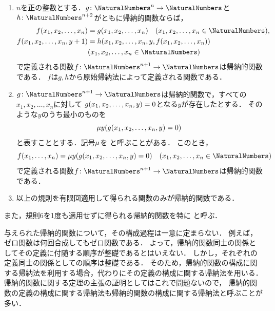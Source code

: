 \begin{Def}
\begin{enumerate}
		      \(f\)は\(g, h\)から関数合成によって得られる関数である．
		\item \(n\)を正の整数とする．\(g \colon \NaturalNumbers^n \to \NaturalNumbers\)と\(h \colon \NaturalNumbers^{n+2}\)がともに帰納的関数ならば，
		      \begin{align*}
			      \apply{f}{x_1, x_2, \dots, x_n}        & = \apply{g}{x_1, x_2, \dots, x_n} \quad \text{(\(x_1, x_2, \dots, x_n \in \NaturalNumbers\))}, \\
			      \apply{f}{x_1, x_2, \dots, x_n, y + 1} & = \apply{h}{x_1, x_2, \dots, x_n, y, \apply{f}{x_1, x_2, \dots, x_n}}                          \\
			                                             & \text{(\(x_1, x_2, \dots, x_n \in \NaturalNumbers\))}
		      \end{align*}
		      で定義される関数\(f \colon \NaturalNumbers^{n+1} \to \NaturalNumbers\)は帰納的関数である．
		      \(f\)は\(g, h\)から原始帰納法によって定義される関数である．
		\item \(g \colon \NaturalNumbers^{n + 1} \to \NaturalNumbers\)は帰納的関数で，すべての\(x_1, x_2, \dots, x_n\)に対して
		      \(\apply{g}{x_1, x_2, \dots, x_n, y} = 0\)となる\(y\)が存在したとする．
		      そのような\(y\)のうち最小のものを
		      \begin{equation}
			      \apply{\muoperator y}{\apply{g}{x_1, x_2, \dots, x_n, y} = 0}
			      \label{eq:muoperator}
		      \end{equation}
		      と表すこととする．記号\(\mu\)を
		      と呼ぶことがある．
		      このとき，
		      \[
			      \apply{f}{x_1, \dots, x_n} = \apply{\muoperator y}{\apply{g}{x_1, x_2, \dots, x_n, y} = 0}
			      \quad \text{(\(x_1, x_2, \dots, x_n \in \NaturalNumbers\))}
		      \]
		      で定義される関数\(f \colon \NaturalNumbers^{n+1} \to \NaturalNumbers\)は帰納的関数である．
		\item 以上の規則を有限回適用して得られる関数のみが帰納的関数である．
	\end{enumerate}

	また，規則6を1度も適用せずに得られる帰納的関数を特に
	と呼ぶ．
\end{Def}

\begin{Note}
	与えられた帰納的関数について，その構成過程は一意に定まらない．
	例えば，ゼロ関数は何回合成してもゼロ関数である．
	よって，帰納的関数同士の関係としてその定義に付随する順序が整礎であるとはいえない．
	しかし，それぞれの定義同士の関係としての順序は整礎である．
	そのため，帰納的関数の構成に関する帰納法を利用する場合，代わりにその定義の構成に関する帰納法を用いる．
	帰納的関数に関する定理の主張の証明としてはこれで問題ないので，
	帰納的関数の定義の構成に関する帰納法も帰納的関数の構成に関する帰納法と呼ぶことが多い．
\end{Note}

